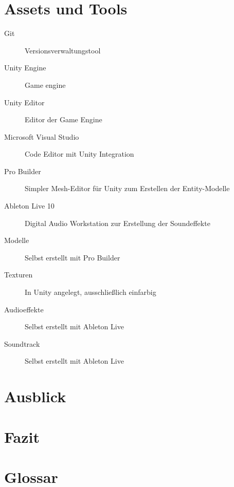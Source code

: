 \documentclass[a4paper,ngerman,12pt]{report}
\begin{document}








\chapter{Assets und Tools}

\begin{description}
\item[Git] Versionsverwaltungstool
\item[Unity Engine] Game engine
\item[Unity Editor] Editor der Game Engine
\item[Microsoft Visual Studio] Code Editor mit Unity Integration
\item[Pro Builder] Simpler Mesh-Editor für Unity zum Erstellen der Entity-Modelle
\item[Ableton Live 10] Digital Audio Workstation zur Erstellung der Soundeffekte
\vspace{5mm}
\item[Modelle] Selbst erstellt mit Pro Builder
\item[Texturen] In Unity angelegt, ausschlie{\ss}lich einfarbig
\item[Audioeffekte] Selbst erstellt mit Ableton Live
\item[Soundtrack] Selbst erstellt mit Ableton Live

\end{description}






\chapter{Ausblick}

\lipsum[3]





\chapter{Fazit}

\lipsum[3]





\chapter{Glossar}
\end{document}
